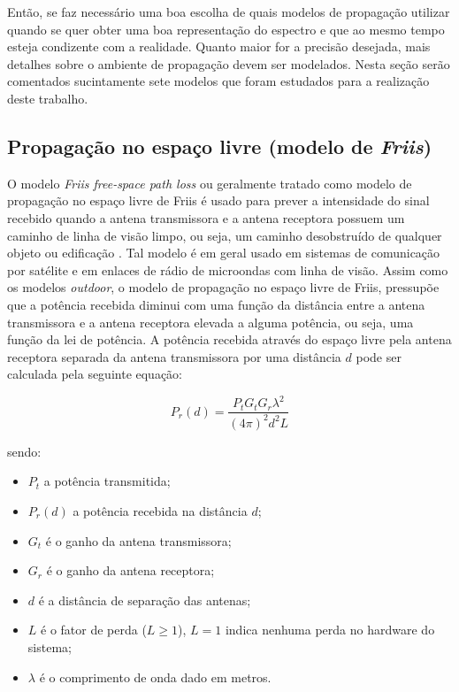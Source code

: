 \documentclass[
	12pt,				%
	twoside,			%
	a4paper,			%
	english,			%
	french,				%
	spanish,			%
	brazil				%
	]{abntex2}
\begin{document}
Então, se faz necessário uma boa escolha de quais modelos de propagação
utilizar quando se quer obter uma boa representação do espectro e que ao
mesmo tempo esteja condizente com a realidade. Quanto maior for a
precisão desejada, mais detalhes sobre o ambiente de propagação devem
ser modelados. Nesta seção serão comentados sucintamente sete modelos
que foram estudados para a realização deste trabalho.

\subsection{\texorpdfstring{Propagação no espaço livre (modelo de
\emph{Friis})}{Propagação no espaço livre (modelo de Friis)}}\label{sec:friis}

O modelo \emph{Friis free-space path loss} ou geralmente tratado como
modelo de propagação no espaço livre de Friis é usado para prever a
intensidade do sinal recebido quando a antena transmissora e a antena
receptora possuem um caminho de linha de visão limpo, ou seja, um
caminho desobstruído de qualquer objeto ou edificação \cite{LUO}. Tal
modelo é em geral usado em sistemas de comunicação por satélite e em
enlaces de rádio de microondas com linha de visão. Assim como os modelos
\emph{outdoor}, o modelo de propagação no espaço livre de Friis,
pressupõe que a potência recebida diminui com uma função da distância
entre a antena transmissora e a antena receptora elevada a alguma
potência, ou seja, uma função da lei de potência. A potência recebida
através do espaço livre pela antena receptora separada da antena
transmissora por uma distância \(d\) pode ser calculada pela seguinte
equação:

\begin{equation}
P_{r}(d)= \frac{P_{t}G_{t}G_{r}\lambda^{2}}{(4\pi)^{2}d^{2}L}
\end{equation}

sendo:

\begin{itemize}
\item
  \(P_{t}\) a potência transmitida;
\item
  \(P_{r}(d)\) a potência recebida na distância \(d\);
\item
  \(G_{t}\) é o ganho da antena transmissora;
\item
  \(G_{r}\) é o ganho da antena receptora;
\item
  \(d\) é a distância de separação das antenas;
\item
  \(L\) é o fator de perda (\(L\geq1\)), \(L = 1\) indica nenhuma perda
  no hardware do sistema;
\item
  \(\lambda\) é o comprimento de onda dado em metros.
\end{itemize}
\end{document}
